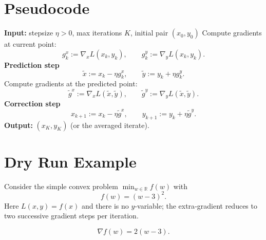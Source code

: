 \documentclass{article}
\newcommand{\R}{\mathbb{R}}
\begin{document}
\section*{Pseudocode}
\begin{algorithm}[H]
\caption{Extra‑Gradient for $\min_x\max_y L(x,y)$}
\begin{algorithmic}[1]
\State \textbf{Input:} stepsize $\eta>0$, max iterations $K$, initial pair $(x_0,y_0)$
    \State Compute gradients at current point:
    \[
    g^x_k:=\nabla_x L(x_k,y_k),\qquad g^y_k:=\nabla_y L(x_k,y_k).
    \]
    \State \textbf{Prediction step}
    \[
    \tilde x:=x_k-\eta g^x_k,\qquad 
    \tilde y:=y_k+\eta g^y_k .
    \]
    \State Compute gradients at the predicted point:
    \[
    \tilde g^x:=\nabla_x L(\tilde x,\tilde y),\qquad 
    \tilde g^y:=\nabla_y L(\tilde x,\tilde y).
    \]
    \State \textbf{Correction step}
    \[
    x_{k+1}:=x_k-\eta \tilde g^x,\qquad 
    y_{k+1}:=y_k+\eta \tilde g^y .
    \]
\EndFor
\State \textbf{Output:} $(x_K,y_K)$ (or the averaged iterate).
\end{algorithmic}
\end{algorithm}

\section*{Dry Run Example}
Consider the simple convex problem $\min_{w\in\R} f(w)$ with
\[
f(w)=(w-3)^2 .
\]
Here $L(x,y)=f(x)$ and there is no $y$‑variable; the extra‑gradient reduces to two successive gradient steps per iteration.

\[
\nabla f(w)=2(w-3).
\]
\end{document}
